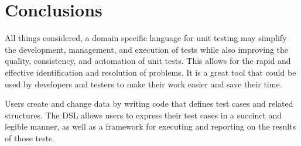 \chapter*{Conclusions}

All things considered, a domain specific language for unit testing may simplify the development, management, and execution of tests while also improving the quality, consistency, and automation of unit tests. This allows for the rapid and effective identification and resolution of problems. It is a great tool that could be used by developers and testers to make their work easier and save their time. 

Users create and change data by writing code that defines test cases and related structures. The DSL allows users to express their test cases in a succinct and legible manner, as well as a framework for executing and reporting on the results of those tests. 
